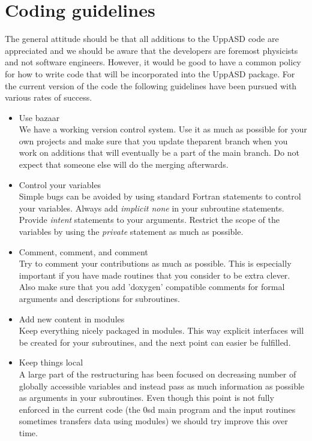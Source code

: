 \documentclass{article}
\begin{document}
\section{Coding guidelines}
The general attitude should be that all additions to the UppASD code are appreciated and we should be aware that the developers are foremost physicists and not software engineers. However, it would be good to have a common policy for how to write code that will be incorporated into the UppASD package. 
For the current version of the code the following guidelines have been pursued with various rates of success.
\begin{itemize}
 \item{Use bazaar} \\
  We have a working version control system. Use it as much as possible for your own projects and make sure that you update theparent branch when you work on additions that will eventually be a part of the main branch. Do not expect that someone else will do the merging afterwards.
 \item{Control your variables} \\
  Simple bugs can be avoided by using standard Fortran statements to control your variables. Always add {\it implicit none} in your subroutine statements. Provide {\it intent} statements to your arguments. Restrict the scope of the variables by using the {\it private} statement as much as possible.
 \item{Comment, comment, and comment} \\
  Try to comment your contributions as much as possible. This is especially important if you have made routines that you consider to be extra clever. Also make sure that you add 'doxygen' compatible comments for formal arguments and descriptions for subroutines.
 \item{Add new content in modules} \\
  Keep everything nicely packaged in modules. This way explicit interfaces will be created for your subroutines, and the next point can easier be fulfilled.
 \item{Keep things local} \\
  A large part of the restructuring has been focused on decreasing number of globally accessible variables and instead pass as much information as possible as arguments in your subroutines. Even though this point is not fully enforced in the current code (the 0sd main program and the input routines sometimes transfers data using modules) we should try improve this over time. 

\end{itemize}
\end{document}
